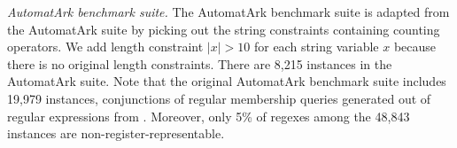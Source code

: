 \medskip
\noindent
\emph{AutomatArk benchmark suite.}
The AutomatArk benchmark suite is adapted from the AutomatArk suite \cite{z3str3re} by picking out the string constraints containing counting operators. We add length constraint $|x| > 10$ for each string variable $x$ because there is no original length constraints. There are 8,215 instances in the AutomatArk suite.
Note that the original AutomatArk benchmark suite \cite{z3str3re} includes 19,979 instances, conjunctions of regular membership queries generated out of regular expressions from \cite{automatark}.
Moreover, only 5\% of regexes among the 48,843 instances are non-register-representable.

